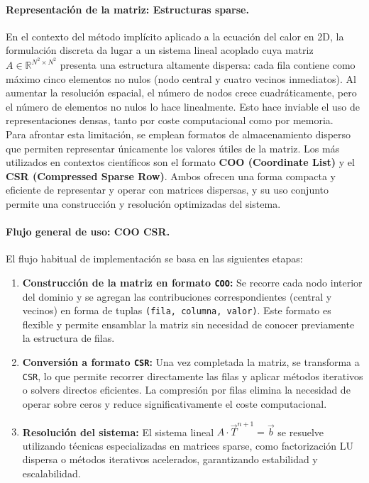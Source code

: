 \documentclass{article}
\begin{document}
\paragraph{Representación de la matriz: Estructuras sparse.} En el contexto del método implícito aplicado a la ecuación del calor en 2D, la formulación discreta da lugar a un sistema lineal acoplado cuya matriz $A \in \mathbb{R}^{N^2 \times N^2}$ presenta una estructura altamente dispersa: cada fila contiene como máximo cinco elementos no nulos (nodo central y cuatro vecinos inmediatos). Al aumentar la resolución espacial, el número de nodos crece cuadráticamente, pero el número de elementos no nulos lo hace linealmente. Esto hace inviable el uso de representaciones densas, tanto por coste computacional como por memoria.\\

Para afrontar esta limitación, se emplean formatos de almacenamiento disperso que permiten representar únicamente los valores útiles de la matriz. Los más utilizados en contextos científicos son el formato \textbf{COO (Coordinate List)} y el \textbf{CSR (Compressed Sparse Row)}. Ambos ofrecen una forma compacta y eficiente de representar y operar con matrices dispersas, y su uso conjunto permite una construcción y resolución optimizadas del sistema.

\paragraph{Flujo general de uso: COO \textrightarrow{} CSR.}

El flujo habitual de implementación se basa en las siguientes etapas:

\begin{enumerate}
    \item \textbf{Construcción de la matriz en formato \texttt{COO}:} Se recorre cada nodo interior del dominio y se agregan las contribuciones correspondientes (central y vecinos) en forma de tuplas \texttt{(fila, columna, valor)}. Este formato es flexible y permite ensamblar la matriz sin necesidad de conocer previamente la estructura de filas.

    \item \textbf{Conversión a formato \texttt{CSR}:} Una vez completada la matriz, se transforma a \texttt{CSR}, lo que permite recorrer directamente las filas y aplicar métodos iterativos o solvers directos eficientes. La compresión por filas elimina la necesidad de operar sobre ceros y reduce significativamente el coste computacional.

    \item \textbf{Resolución del sistema:} El sistema lineal $A \cdot \vec{T}^{n+1} = \vec{b}$ se resuelve utilizando técnicas especializadas en matrices sparse, como factorización LU dispersa o métodos iterativos acelerados, garantizando estabilidad y escalabilidad.
\end{enumerate}
\end{document}
